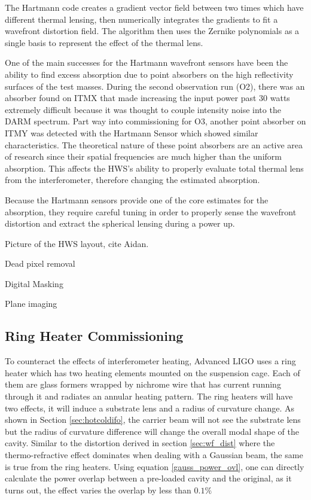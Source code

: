 	The Hartmann code creates a gradient vector field between two times which have different thermal lensing, then numerically integrates the gradients to fit a wavefront distortion field.  The algorithm then uses the Zernike polynomials as a single basis to represent the effect of the thermal lens.
	
	One of the main successes for the Hartmann wavefront sensors have been the ability to find excess absorption due to point absorbers on the high reflectivity surfaces of the test masses.  During the second observation run (O2), there was an absorber found on ITMX that made increasing the input power past 30 watts extremely difficult because it was thought to couple intensity noise into the DARM spectrum.  Part way into commissioning for O3, another point absorber on ITMY was detected with the Hartmann Sensor which showed similar characteristics.  The theoretical nature of these point absorbers are an active area of research since their spatial frequencies are much higher than the uniform absorption.  This affects the HWS's ability to properly evaluate total thermal lens from the interferometer, therefore changing the estimated absorption.
	
	Because the Hartmann sensors provide one of the core estimates for the absorption, they require careful tuning in order to properly sense the wavefront distortion and extract the spherical lensing during a power up.
	
	Picture of the HWS layout, cite Aidan.
	
	Dead pixel removal
	
	Digital Masking
	
	Plane imaging
	\cite{AWC_current}
	
	
	\subsection{Ring Heater Commissioning}\label{Sec:RH}
	To counteract the effects of interferometer heating, Advanced LIGO uses a ring heater \cite{ramette_analytical} \cite{wang_thermalmodel} which has two heating elements mounted on the suspension cage. Each of them are glass formers wrapped by nichrome wire that has current running through it and radiates an annular heating pattern. The ring heaters will have two effects, it will induce a substrate lens and a radius of curvature change.  As shown in Section \ref{sec:hotcoldifo}, the carrier beam will not see the substrate lens but the radius of curvature difference will change the overall modal shape of the cavity.  Similar to the distortion derived in section \ref{sec:wf_dist} where the thermo-refractive effect dominates when dealing with a Gaussian beam, the same is true from the ring heaters. Using equation \ref{gauss_power_ovl}, one can directly calculate the power overlap between a pre-loaded cavity and the original, as it turns out, the effect varies the overlap by less than $0.1\%$
	

